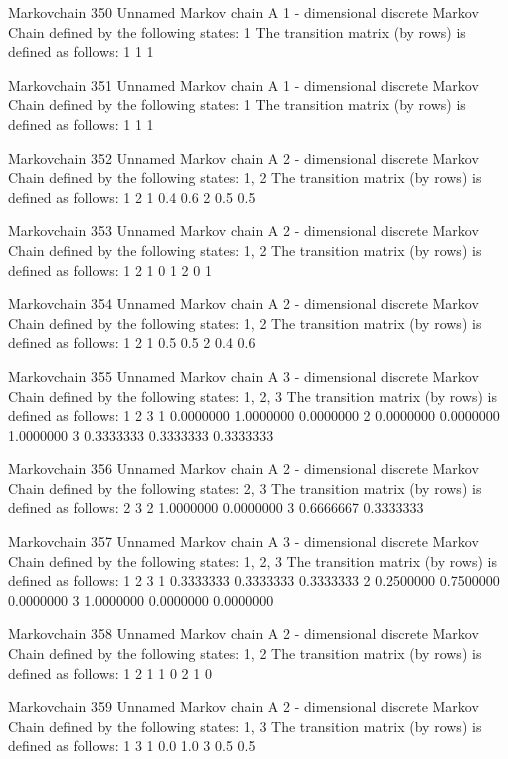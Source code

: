 \documentclass[
  nojss]{jss}
\begin{document}
\begin{CodeChunk}
\begin{CodeOutput}
Markovchain  350 
Unnamed Markov chain 
 A  1 - dimensional discrete Markov Chain defined by the following states: 
 1 
 The transition matrix  (by rows)  is defined as follows: 
  1
1 1

Markovchain  351 
Unnamed Markov chain 
 A  1 - dimensional discrete Markov Chain defined by the following states: 
 1 
 The transition matrix  (by rows)  is defined as follows: 
  1
1 1

Markovchain  352 
Unnamed Markov chain 
 A  2 - dimensional discrete Markov Chain defined by the following states: 
 1, 2 
 The transition matrix  (by rows)  is defined as follows: 
    1   2
1 0.4 0.6
2 0.5 0.5

Markovchain  353 
Unnamed Markov chain 
 A  2 - dimensional discrete Markov Chain defined by the following states: 
 1, 2 
 The transition matrix  (by rows)  is defined as follows: 
  1 2
1 0 1
2 0 1

Markovchain  354 
Unnamed Markov chain 
 A  2 - dimensional discrete Markov Chain defined by the following states: 
 1, 2 
 The transition matrix  (by rows)  is defined as follows: 
    1   2
1 0.5 0.5
2 0.4 0.6

Markovchain  355 
Unnamed Markov chain 
 A  3 - dimensional discrete Markov Chain defined by the following states: 
 1, 2, 3 
 The transition matrix  (by rows)  is defined as follows: 
          1         2         3
1 0.0000000 1.0000000 0.0000000
2 0.0000000 0.0000000 1.0000000
3 0.3333333 0.3333333 0.3333333

Markovchain  356 
Unnamed Markov chain 
 A  2 - dimensional discrete Markov Chain defined by the following states: 
 2, 3 
 The transition matrix  (by rows)  is defined as follows: 
          2         3
2 1.0000000 0.0000000
3 0.6666667 0.3333333

Markovchain  357 
Unnamed Markov chain 
 A  3 - dimensional discrete Markov Chain defined by the following states: 
 1, 2, 3 
 The transition matrix  (by rows)  is defined as follows: 
          1         2         3
1 0.3333333 0.3333333 0.3333333
2 0.2500000 0.7500000 0.0000000
3 1.0000000 0.0000000 0.0000000

Markovchain  358 
Unnamed Markov chain 
 A  2 - dimensional discrete Markov Chain defined by the following states: 
 1, 2 
 The transition matrix  (by rows)  is defined as follows: 
  1 2
1 1 0
2 1 0

Markovchain  359 
Unnamed Markov chain 
 A  2 - dimensional discrete Markov Chain defined by the following states: 
 1, 3 
 The transition matrix  (by rows)  is defined as follows: 
    1   3
1 0.0 1.0
3 0.5 0.5


\end{CodeOutput}
\end{CodeChunk}
\end{document}
